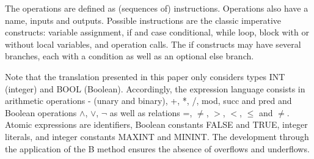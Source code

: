 \documentclass{llncs}
\newcommand{\B}[1]{\textsf{#1}}
\begin{document}
The operations are defined as (sequences of) instructions. Operations also
have a name, inputs and outputs. Possible instructions are the classic
imperative constructs: variable assignment, if and case conditional, while loop,
block with or without local variables, and operation calls. The if constructs
may have several branches, each with a condition as well as an optional else
branch. 

Note that the translation presented in this paper only considers types \B{INT}
(integer) and \B{BOOL} (Boolean). Accordingly, the expression language consists
in arithmetic operations \B{-} (unary and binary), \B{+}, \B{*}, \B{/}, \B{mod},
\B{succ} and \B{pred} and Boolean operations
\B{$\land$}, \B{$\lor$}, \B{$\neg$} as well as relations \B{=}, \B{$\neq$},
\B{$>$}, \B{$<$}, \B{$\leq$} and \B{$\neq$}. Atomic expressions are identifiers,
Boolean constants \B{FALSE} and \B{TRUE}, integer literals, and integer
constants \B{MAXINT} and \B{MININT}. The development through the application of
the B method ensures the absence of overflows and underflows.
\end{document}
